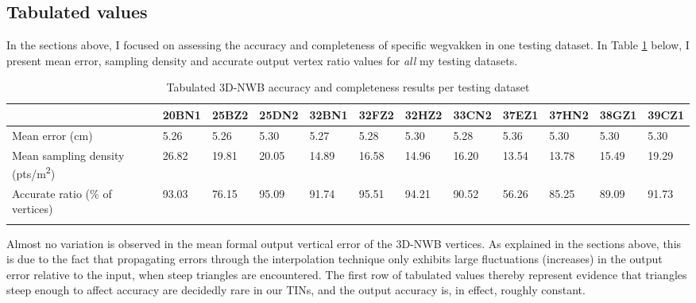 \subsection{Tabulated values}
\label{sub:accuracytabulated}

In the sections above, I focused on assessing the accuracy and completeness of specific wegvakken in one testing dataset. In Table \ref{tab:accuracytabulated} below, I present mean error, sampling density and accurate output vertex ratio values for \textit{all} my testing datasets.

\begin{table}[]
\begin{tabular}{@{}llllllllllll@{}}
\toprule
\multicolumn{1}{c}{}                             & 20BN1 & 25BZ2 & 25DN2 & 32BN1 & 32FZ2 & 32HZ2 & 33CN2 & 37EZ1 & 37HN2 & 38GZ1 & 39CZ1 \\ \midrule
Mean error (cm)                                  & 5.26  & 5.26  & 5.30  & 5.27  & 5.28  & 5.30  & 5.28  & 5.36  & 5.30  & 5.30  & 5.30  \\
Mean sampling density (pts/m\textsuperscript{2}) & 26.82 & 19.81 & 20.05 & 14.89 & 16.58 & 14.96 & 16.20 & 13.54 & 13.78 & 15.49 & 19.29 \\
Accurate ratio (\% of vertices)                  & 93.03 & 76.15 & 95.09 & 91.74 & 95.51 & 94.21 & 90.52 & 56.26 & 85.25 & 89.09 & 91.73 \\ \bottomrule
\caption{Tabulated 3D-NWB accuracy and completeness results per testing dataset \label{tab:accuracytabulated}}
\end{tabular}
\end{table}

Almost no variation is observed in the mean formal output vertical error of the 3D-NWB vertices. As explained in the sections above, this is due to the fact that propagating errors through the interpolation technique only exhibits large fluctuations (increases) in the output error relative to the input, when steep triangles are encountered. The first row of tabulated values thereby represent evidence that triangles steep enough to affect accuracy are decidedly rare in our TINs, and the output accuracy is, in effect, roughly constant.

